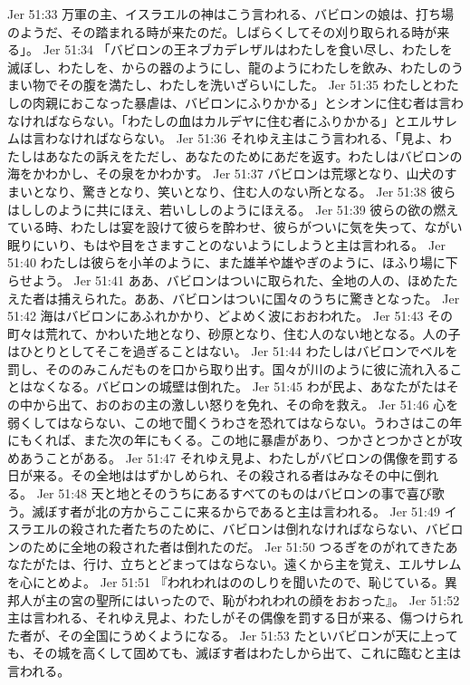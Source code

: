 Jer 51:33  万軍の主、イスラエルの神はこう言われる、バビロンの娘は、打ち場のようだ、その踏まれる時が来たのだ。しばらくしてその刈り取られる時が来る」。
Jer 51:34  「バビロンの王ネブカデレザルはわたしを食い尽し、わたしを滅ぼし、わたしを、からの器のようにし、龍のようにわたしを飲み、わたしのうまい物でその腹を満たし、わたしを洗いざらいにした。
Jer 51:35  わたしとわたしの肉親におこなった暴虐は、バビロンにふりかかる」とシオンに住む者は言わなければならない。「わたしの血はカルデヤに住む者にふりかかる」とエルサレムは言わなければならない。
Jer 51:36  それゆえ主はこう言われる、「見よ、わたしはあなたの訴えをただし、あなたのためにあだを返す。わたしはバビロンの海をかわかし、その泉をかわかす。
Jer 51:37  バビロンは荒塚となり、山犬のすまいとなり、驚きとなり、笑いとなり、住む人のない所となる。
Jer 51:38  彼らはししのように共にほえ、若いししのようにほえる。
Jer 51:39  彼らの欲の燃えている時、わたしは宴を設けて彼らを酔わせ、彼らがついに気を失って、ながい眠りにいり、もはや目をさますことのないようにしようと主は言われる。
Jer 51:40  わたしは彼らを小羊のように、また雄羊や雄やぎのように、ほふり場に下らせよう。
Jer 51:41  ああ、バビロンはついに取られた、全地の人の、ほめたたえた者は捕えられた。ああ、バビロンはついに国々のうちに驚きとなった。
Jer 51:42  海はバビロンにあふれかかり、どよめく波におおわれた。
Jer 51:43  その町々は荒れて、かわいた地となり、砂原となり、住む人のない地となる。人の子はひとりとしてそこを過ぎることはない。
Jer 51:44  わたしはバビロンでベルを罰し、そののみこんだものを口から取り出す。国々が川のように彼に流れ入ることはなくなる。バビロンの城壁は倒れた。
Jer 51:45  わが民よ、あなたがたはその中から出て、おのおの主の激しい怒りを免れ、その命を救え。
Jer 51:46  心を弱くしてはならない、この地で聞くうわさを恐れてはならない。うわさはこの年にもくれば、また次の年にもくる。この地に暴虐があり、つかさとつかさとが攻めあうことがある。
Jer 51:47  それゆえ見よ、わたしがバビロンの偶像を罰する日が来る。その全地ははずかしめられ、その殺される者はみなその中に倒れる。
Jer 51:48  天と地とそのうちにあるすべてのものはバビロンの事で喜び歌う。滅ぼす者が北の方からここに来るからであると主は言われる。
Jer 51:49  イスラエルの殺された者たちのために、バビロンは倒れなければならない、バビロンのために全地の殺された者は倒れたのだ。
Jer 51:50  つるぎをのがれてきたあなたがたは、行け、立ちとどまってはならない。遠くから主を覚え、エルサレムを心にとめよ。
Jer 51:51  『われわれはののしりを聞いたので、恥じている。異邦人が主の宮の聖所にはいったので、恥がわれわれの顔をおおった』。
Jer 51:52  主は言われる、それゆえ見よ、わたしがその偶像を罰する日が来る、傷つけられた者が、その全国にうめくようになる。
Jer 51:53  たといバビロンが天に上っても、その城を高くして固めても、滅ぼす者はわたしから出て、これに臨むと主は言われる。
